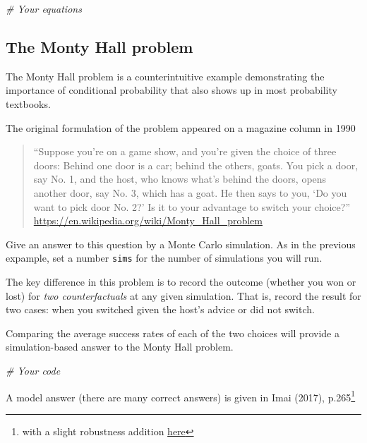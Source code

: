 \documentclass[]{book}
\newenvironment{Shaded}{\begin{snugshade}}{\end{snugshade}}
\newcommand{\CommentTok}[1]{\textcolor[rgb]{0.56,0.35,0.01}{\textit{#1}}}
\let\rmarkdownfootnote\footnote%
\def\footnote{\protect\rmarkdownfootnote}
\theoremstyle{definition}
\theoremstyle{definition}
\theoremstyle{definition}
\theoremstyle{remark}
\begin{document}
\begin{Shaded}
\begin{Highlighting}[]
\CommentTok{# Your equations}
\end{Highlighting}
\end{Shaded}

\subsection{The Monty Hall problem}\label{the-monty-hall-problem}

The Monty Hall problem is a counterintuitive example demonstrating the
importance of conditional probability that also shows up in most
probability textbooks.

The original formulation of the problem appeared on a magazine column in
1990

\begin{quote}
``Suppose you're on a game show, and you're given the choice of three
doors: Behind one door is a car; behind the others, goats. You pick a
door, say No. 1, and the host, who knows what's behind the doors, opens
another door, say No. 3, which has a goat. He then says to you, `Do you
want to pick door No. 2?' Is it to your advantage to switch your
choice?'' \url{https://en.wikipedia.org/wiki/Monty_Hall_problem}
\end{quote}

Give an answer to this question by a Monte Carlo simulation. As in the
previous expample, set a number \texttt{sims} for the number of
simulations you will run.

The key difference in this problem is to record the outcome (whether you
won or lost) for \emph{two counterfactuals} at any given simulation.
That is, record the result for two cases: when you switched given the
host's advice or did not switch.

Comparing the average success rates of each of the two choices will
provide a simulation-based answer to the Monty Hall problem.

\begin{Shaded}
\begin{Highlighting}[]
\CommentTok{# Your code}
\end{Highlighting}
\end{Shaded}

A model answer (there are many correct answers) is given in Imai (2017),
p.265\footnote{with a slight robustness addition
  \href{https://github.com/kosukeimai/qss/blob/master/errata/QSSerrata.pdf}{here}}
\end{document}
